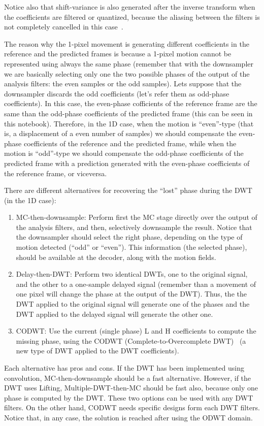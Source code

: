 Notice also that shift-variance is also generated after the inverse
transform when the coefficients are filtered or quantized, because the
aliasing between the filters is not completely cancelled in this
case~\cite{bradley2003shift}.


The reason why the 1-pixel movement is generating different
coefficients in the reference and the predicted frames is because a
1-pixel motion cannot be represented using always the same phase
(remember that with the downsampler we are basically selecting only
one the two possible phases of the output of the analysis filters: the
even samples or the odd samples). Lets suppose that the downsampler
discards the odd coefficients (let's refer them as odd-phase
coefficients). In this case, the even-phase cofficients of the
reference frame are the same than the odd-phase coefficients of the
predicted frame (this can be seen in this notebook). Therefore, in the
1D case, when the motion is ``even''-type (that is, a displacement of
a even number of samples) we should compensate the even-phase
coefficients of the reference and the predicted frame, while when the
motion is ``odd''-type we should compensate the odd-phase coefficients
of the predicted frame with a prediction generated with the even-phase
coefficients of the reference frame, or viceversa.

There are different alternatives for recovering the ``lost'' phase
during the DWT (in the 1D case):
\begin{enumerate}
\item MC-then-downsample: Perform first the MC stage directly over the
  output of the analysis filters, and then, selectively downsample the
  result. Notice that the downsampler should select the right phase,
  depending on the type of motion detected (``odd'' or ``even''). This
  information (the selected phase), should be available at the
  decoder, along with the motion fields.
\item Delay-then-DWT: Perform two identical DWTs, one to the original
  signal, and the other to a one-sample delayed signal (remember than
  a movement of one pixel will change the phase at the output of the
  DWT). Thus, the the DWT applied to the original signal will generate
  one of the phases and the DWT applied to the delayed signal will
  generate the other one.
\item CODWT: Use the current (single phase) L and H coefficients to
  compute the missing phase, using the CODWT (Complete-to-Overcomplete
  DWT)~\cite{andreopoulos2005complete} (a new type of DWT applied to
  the DWT coefficients).
\end{enumerate}
Each alternative has pros and cons. If the DWT has been implemented
using convolution, MC-then-downsample should be a fast
alternative. However, if the DWT uses Lifting, Multiple-DWT-then-MC
should be fast also, because only one phase is computed by the
DWT. These two options can be used with any DWT filters. On the other
hand, CODWT needs specific designs form each DWT filters. Notice that, in any case, the solution is reached after using the ODWT domain.

